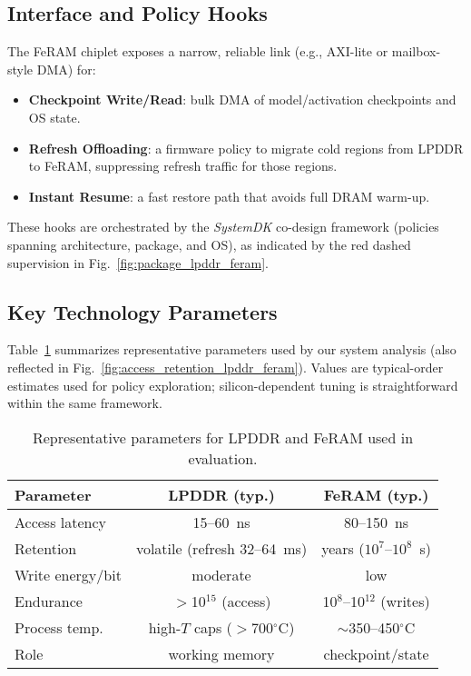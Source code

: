\subsection{Interface and Policy Hooks}
The FeRAM chiplet exposes a narrow, reliable link (e.g., AXI-lite or mailbox-style DMA) for:
\begin{itemize}
  \item \textbf{Checkpoint Write/Read}: bulk DMA of model/activation checkpoints and OS state.
  \item \textbf{Refresh Offloading}: a firmware policy to migrate cold regions from LPDDR to FeRAM, suppressing refresh traffic for those regions.
  \item \textbf{Instant Resume}: a fast restore path that avoids full DRAM warm-up.
\end{itemize}
These hooks are orchestrated by the \emph{SystemDK} co-design framework (policies spanning architecture, package, and OS), as indicated by the red dashed supervision in Fig.~\ref{fig:package_lpddr_feram}.

\subsection{Key Technology Parameters}
Table~\ref{tab:tech_params} summarizes representative parameters used by our system analysis (also reflected in Fig.~\ref{fig:access_retention_lpddr_feram}). Values are typical-order estimates used for policy exploration; silicon-dependent tuning is straightforward within the same framework.

\begin{table}[t]
  \centering
  \caption{Representative parameters for LPDDR and FeRAM used in evaluation.}
  \label{tab:tech_params}
  \vspace{3pt}
  \begin{tabular}{@{}lcc@{}}
    \toprule
    Parameter & LPDDR (typ.) & FeRAM (typ.) \\
    \midrule
    Access latency & 15--60~ns & 80--150~ns \\
    Retention & volatile (refresh 32--64~ms) & years ($10^7$--$10^8$~s) \\
    Write energy/bit & moderate & low \\
    Endurance & $>$10$^{15}$ (access) & 10$^8$--10$^{12}$ (writes) \\
    Process temp. & high-$T$ caps ($>$700$^\circ$C) & $\sim$350--450$^\circ$C \\
    Role & working memory & checkpoint/state \\
    \bottomrule
  \end{tabular}
\end{table}

